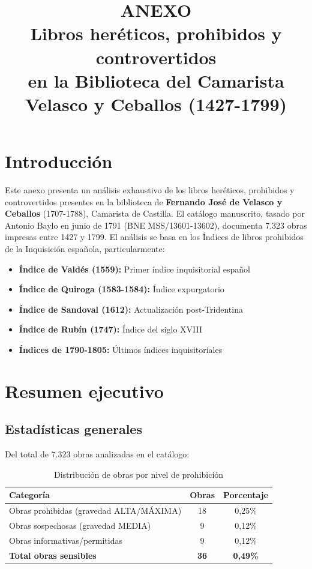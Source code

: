 \documentclass[12pt,a4paper]{article}
\title{\textbf{ANEXO}\\
\Large{Libros heréticos, prohibidos y controvertidos}\\
\large{en la Biblioteca del Camarista Velasco y Ceballos (1427-1799)}}
\author{}
\date{}
\begin{document}
\maketitle

\section*{Introducción}

Este anexo presenta un análisis exhaustivo de los libros heréticos, prohibidos y controvertidos presentes en la biblioteca de \textbf{Fernando José de Velasco y Ceballos} (1707-1788), Camarista de Castilla. El catálogo manuscrito, tasado por Antonio Baylo en junio de 1791 (BNE MSS/13601-13602), documenta 7.323 obras impresas entre 1427 y 1799. El análisis se basa en los Índices de libros prohibidos de la Inquisición española, particularmente:

\begin{itemize}
    \item \textbf{Índice de Valdés (1559):} Primer índice inquisitorial español
    \item \textbf{Índice de Quiroga (1583-1584):} Índice expurgatorio
    \item \textbf{Índice de Sandoval (1612):} Actualización post-Tridentina
    \item \textbf{Índice de Rubín (1747):} Índice del siglo XVIII
    \item \textbf{Índices de 1790-1805:} Últimos índices inquisitoriales
\end{itemize}

\section{Resumen ejecutivo}

\subsection{Estadísticas generales}

Del total de 7.323 obras analizadas en el catálogo:

\begin{table}[h]
\centering
\caption{Distribución de obras por nivel de prohibición}
\begin{tabular}{lcc}
\toprule
\textbf{Categoría} & \textbf{Obras} & \textbf{Porcentaje} \\
\midrule
Obras prohibidas (gravedad ALTA/MÁXIMA) & 18 & 0,25\% \\
Obras sospechosas (gravedad MEDIA) & 9 & 0,12\% \\
Obras informativas/permitidas & 9 & 0,12\% \\
\midrule
\textbf{Total obras sensibles} & \textbf{36} & \textbf{0,49\%} \\
\bottomrule
\end{tabular}
\end{table}
\end{document}
